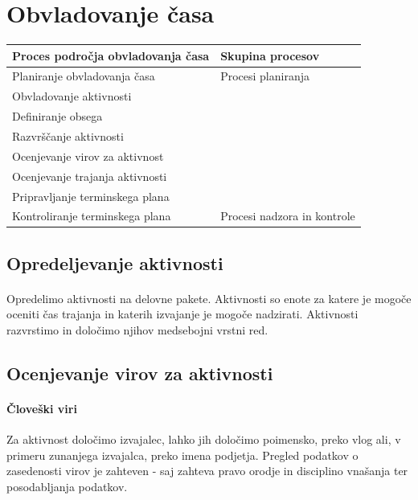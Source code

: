 \documentclass[a4paper,12pt]{report}
\begin{document}
   \section{Obvladovanje časa}
      \begin{center}
         \begin{tabular}{|l|l|}
            \hline
            \textbf{Proces področja obvladovanja časa} & \textbf{Skupina procesov} \\
            \hline
            \hline
            Planiranje obvladovanja časa & Procesi planiranja \\
            Obvladovanje aktivnosti & \\
            Definiranje obsega & \\
            Razvrščanje aktivnosti & \\
            Ocenjevanje virov za aktivnost & \\
            Ocenjevanje trajanja aktivnosti & \\
            Pripravljanje terminskega plana & \\
            \hline
            Kontroliranje terminskega plana & Procesi nadzora in kontrole \\
            \hline
         \end{tabular}
      \end{center}
      
      \subsection{Opredeljevanje aktivnosti}
         \paragraph{}Opredelimo aktivnosti na delovne pakete. Aktivnosti so enote za katere je mogoče oceniti čas trajanja in katerih izvajanje je mogoče nadzirati. Aktivnosti razvrstimo in določimo njihov medsebojni vrstni red.
      \subsection{Ocenjevanje virov za aktivnosti}
         \paragraph{Človeški viri} Za aktivnost določimo izvajalec, lahko jih določimo poimensko, preko vlog ali, v primeru zunanjega izvajalca, preko imena podjetja. Pregled podatkov o zasedenosti virov je zahteven - saj zahteva pravo orodje in disciplino vnašanja ter posodabljanja podatkov.
\end{document}

